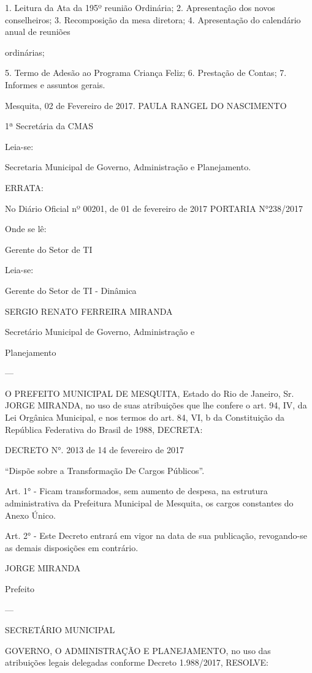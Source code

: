 \documentclass{doliberto}
\begin{document}
1.  Leitura da Ata da 195º reunião Ordinária; 
2.  Apresentação dos novos conselheiros; 
3.  Recomposição da mesa diretora; 
4.  Apresentação  do  calendário  anual  de  reuniões 

ordinárias; 

5.  Termo de Adesão ao Programa Criança Feliz; 
6.  Prestação de Contas; 
7.  Informes e assuntos gerais. 

 

Mesquita, 02 de Fevereiro de 2017. 
PAULA RANGEL DO NASCIMENTO 

1ª Secretária da CMAS 
 
Leia-se: 

Secretaria Municipal de Governo, Administração e 
Planejamento. 

ERRATA: 
 
No Diário Oficial nº 00201, de 01 de fevereiro de 2017 
PORTARIA N°238/2017 
 
Onde se lê: 
 
Gerente do Setor de TI 
 
Leia-se: 
 
Gerente do Setor de TI - Dinâmica 
 
SERGIO RENATO FERREIRA MIRANDA 

Secretário Municipal de Governo, Administração e 

Planejamento 

---

O PREFEITO MUNICIPAL DE MESQUITA, Estado do Rio de 
Janeiro,  Sr.  JORGE  MIRANDA,  no  uso  de  suas  atribuições 
que  lhe  confere  o  art.  94,  IV,  da  Lei  Orgânica  Municipal,  e 
nos  termos  do  art.  84,  VI,  b  da  Constituição  da  República 
Federativa do Brasil de 1988, DECRETA: 

DECRETO N°. 2013 de 14 de fevereiro de 2017 

“Dispõe sobre a Transformação De Cargos Públicos”. 

Art. 1° - Ficam transformados, sem aumento de despesa, na 
estrutura  administrativa  da  Prefeitura  Municipal  de 
Mesquita, os cargos constantes do Anexo Único. 

Art.  2°  -  Este  Decreto  entrará  em  vigor  na  data  de  sua 
publicação,  revogando-se  as  demais  disposições  em 
contrário. 

JORGE MIRANDA 

Prefeito 

---

SECRETÁRIO  MUNICIPAL 

GOVERNO, 
O 
ADMINISTRAÇÃO  E  PLANEJAMENTO,  no  uso  das 
atribuições legais delegadas conforme Decreto 1.988/2017, 
RESOLVE: 
\end{document}
